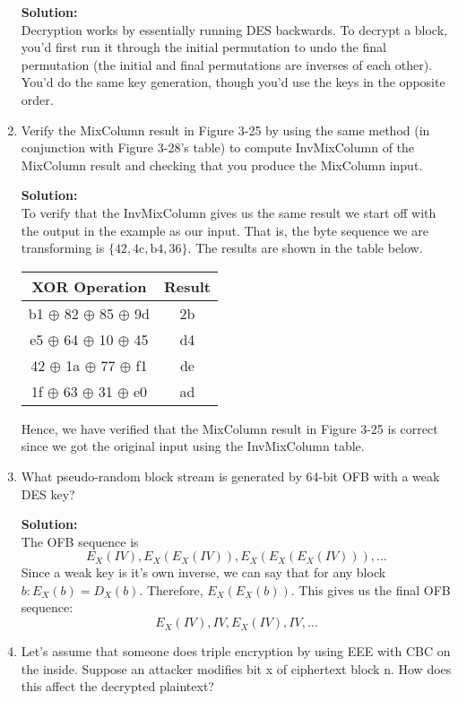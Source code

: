 \documentclass[11pt]{article}
\begin{document}
\begin{enumerate}[1)]
\textbf{Solution: } \\
Decryption works by essentially running DES backwards. To decrypt a block, you'd first run it through the initial permutation to undo the final permutation (the initial and final permutations are inverses of each other). You'd do the same key generation, though you'd use the keys in the opposite order.  

\newpage

\item Verify the MixColumn result in Figure 3-25 by using the same method (in conjunction with Figure 3-28's table) to compute InvMixColumn of the MixColumn result and checking that you produce the MixColumn input.

\textbf{Solution: } \\
To verify that the InvMixColumn gives us the same result we start off with the output in the example as our input.  That is, the byte sequence we are transforming is $\{ \text{42}, \text{4c}, \text{b4}, \text{36} \}$.  The results are shown in the table below.  

\begin{center}
\begin{tabular}{ |c|c| }
\hline
XOR Operation & Result \\
\hline
b1 $\oplus$ 82 $\oplus$ 85 $\oplus$ 9d & 2b \\
e5 $\oplus$ 64 $\oplus$ 10 $\oplus$ 45 & d4 \\
42 $\oplus$ 1a $\oplus$ 77 $\oplus$ f1 & de \\
1f $\oplus$ 63 $\oplus$ 31 $\oplus$ e0 & ad \\
\hline
\end{tabular}
\end{center}

Hence, we have verified that the MixColumn result in Figure 3-25 is correct since we got the original input using the InvMixColumn table.  

\item What pseudo-random block stream is generated by 64-bit OFB with a weak DES key?

\textbf{Solution: } \\
The OFB sequence is $$ E_X(IV), E_X(E_X(IV)), E_X(E_X(E_X(IV))), \hdots $$
Since a weak key is it's own inverse, we can say that for any block $b: E_X(b) = D_X(b)$.  Therefore, $E_X(E_X(b))$.  
This gives us the final OFB sequence: $$E_X(IV), IV, E_X(IV), IV, \hdots $$

\item Let's assume that someone does triple encryption by using EEE with CBC on the inside. Suppose an attacker modifies bit x of ciphertext block n. How does this affect the decrypted plaintext?


\end{enumerate}
\end{document}

